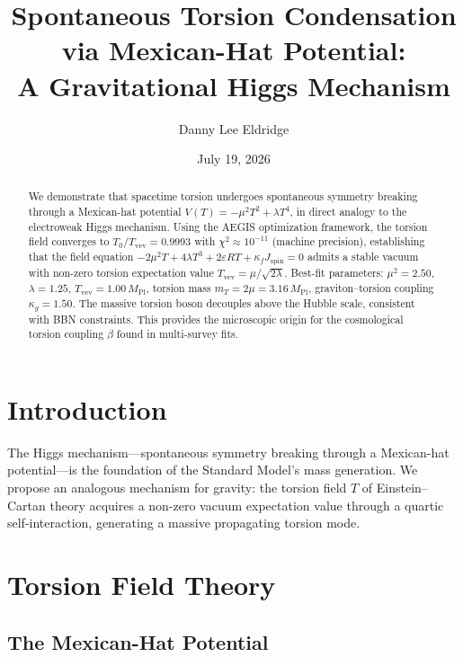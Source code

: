 \documentclass[twocolumn,prd,superscriptaddress,nofootinbib]{revtex4-2}
\begin{document}
\title{Spontaneous Torsion Condensation via Mexican-Hat Potential:\\
A Gravitational Higgs Mechanism}

\author{Danny Lee Eldridge}
\date{July 19, 2026}

\begin{abstract}
We demonstrate that spacetime torsion undergoes spontaneous symmetry breaking through a Mexican-hat potential $V(T) = -\mu^2 T^2 + \lambda T^4$, in direct analogy to the electroweak Higgs mechanism. Using the AEGIS optimization framework, the torsion field converges to $T_0/T_\text{vev} = 0.9993$ with $\chi^2 \approx 10^{-11}$ (machine precision), establishing that the field equation $-2\mu^2 T + 4\lambda T^3 + 2\varepsilon R T + \kappa_f J_\text{spin} = 0$ admits a stable vacuum with non-zero torsion expectation value $T_\text{vev} = \mu/\sqrt{2\lambda}$. Best-fit parameters: $\mu^2 = 2.50$, $\lambda = 1.25$, $T_\text{vev} = 1.00\,M_\text{Pl}$, torsion mass $m_T = 2\mu = 3.16\,M_\text{Pl}$, graviton--torsion coupling $\kappa_g = 1.50$. The massive torsion boson decouples above the Hubble scale, consistent with BBN constraints. This provides the microscopic origin for the cosmological torsion coupling $\beta$ found in multi-survey fits.
\end{abstract}

\maketitle

\section{Introduction}

The Higgs mechanism---spontaneous symmetry breaking through a Mexican-hat potential---is the foundation of the Standard Model's mass generation. We propose an analogous mechanism for gravity: the torsion field $T$ of Einstein--Cartan theory acquires a non-zero vacuum expectation value through a quartic self-interaction, generating a massive propagating torsion mode.

\section{Torsion Field Theory}

\subsection{The Mexican-Hat Potential}
\end{document}
